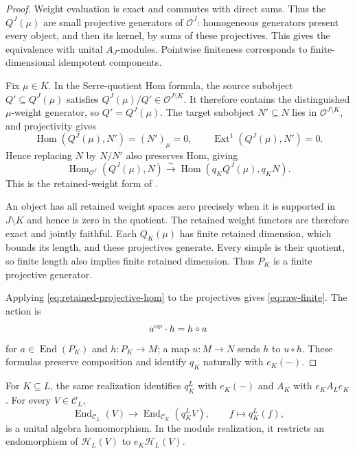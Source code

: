 \documentclass[11pt,reqno]{amsart}
\newcommand{\OO}{\mathcal O}\newcommand{\CC}{\mathscr C}\newcommand{\RR}{\mathcal R}\newcommand{\DD}{\mathcal D}
\newcommand{\Hom}{\operatorname{Hom}}\newcommand{\End}{\operatorname{End}}\newcommand{\Ext}{\operatorname{Ext}}
\theoremstyle{definition}
\theoremstyle{remark}
\numberwithin{equation}{section}
\begin{document}
\begin{proof}
Weight evaluation is exact and commutes with direct sums. Thus the
$Q^J(\mu)$ are small projective generators of $\OO^J$: homogeneous
generators present every object, and then its kernel, by sums of
these projectives. This gives the equivalence with unital $A_J$-modules.
Pointwise finiteness corresponds to finite-dimensional idempotent
components.

Fix $\mu\in K$. In the Serre-quotient Hom formula, the source
subobject $Q'\subseteq Q^J(\mu)$ satisfies
$Q^J(\mu)/Q'\in\OO^{J\setminus K}$. It therefore contains the
distinguished $\mu$-weight generator, so $Q'=Q^J(\mu)$.
The target subobject $N'\subseteq N$ lies in $\OO^{J\setminus K}$,
and projectivity gives
\[
 \Hom(Q^J(\mu),N')=(N')_\mu=0,
 \qquad \Ext^1(Q^J(\mu),N')=0.
\]
Hence replacing $N$ by $N/N'$ also preserves Hom, giving
\begin{equation}\label{eq:retained-projective-hom}
 \Hom_{\OO^J}(Q^J(\mu),N)
 \xrightarrow{\sim}
 \Hom(q_KQ^J(\mu),q_KN).
\end{equation}
This is the retained-weight form of
\cite[Section~17 and Proposition~24]{Fiebig}.

An object has all retained weight spaces zero precisely when it is
supported in $J\setminus K$ and hence is zero in the quotient.
The retained weight functors are therefore exact and jointly faithful.
Each $Q_K(\mu)$ has finite retained dimension, which bounds
its length, and these projectives generate. Every simple is their
quotient, so finite length also implies finite retained dimension.
Thus $P_K$ is a finite projective generator.

Applying \eqref{eq:retained-projective-hom} to the projectives gives
\eqref{eq:raw-finite}. The action is
\[
 a^{\mathrm{op}}\cdot h=h\circ a
\]
for $a\in\End(P_K)$ and $h:P_K\to M$; a map $u:M\to N$
sends $h$ to $u\circ h$. These formulas preserve composition and
identify $q_K$ naturally with $e_K(-)$.
\end{proof}

For $K\subseteq L$, the same realization identifies $q_K^L$ with
$e_K(-)$ and $A_K$ with $e_KA_Le_K$. For every $V\in\CC_L$,
\begin{equation}\label{eq:quotient-end-map}
 \End_{\CC_L}(V)\longrightarrow\End_{\CC_K}(q_K^LV),
 \qquad f\longmapsto q_K^L(f),
\end{equation}
is a unital algebra homomorphism. In the module realization, it
restricts an endomorphism of $\mathcal H_L(V)$ to
$e_K\mathcal H_L(V)$.
\end{document}
